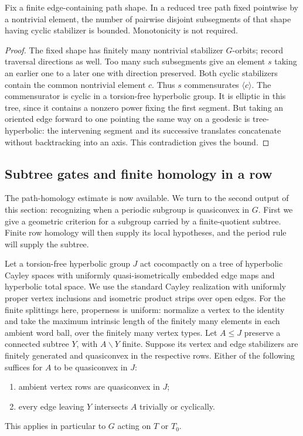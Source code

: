 \begin{lemma}\label{row:cyclic-dictionary}
Fix a finite edge-containing path shape. In a reduced tree path
fixed pointwise by a nontrivial element, the number of pairwise
disjoint subsegments of that shape having cyclic stabilizer is
bounded. Monotonicity is not required.
\end{lemma}

\begin{proof}
The fixed shape has finitely many nontrivial stabilizer \(G\)-orbits;
record traversal directions as well. Too many such subsegments
give an element \(s\) taking an earlier one to a later one with
direction preserved. Both cyclic stabilizers contain the common
nontrivial element \(c\). Thus \(s\) commensurates \(\langle c\rangle\).
The commensurator is cyclic in a torsion-free hyperbolic group.
It is elliptic in this tree, since it contains a nonzero power
fixing the first segment. But taking an oriented edge forward to
one pointing the same way on a geodesic is tree-hyperbolic: the
intervening segment and its successive translates concatenate
without backtracking into an axis. This contradiction gives the bound.
\end{proof}

\subsection{Subtree gates and finite homology in a row}

The path-homology estimate is now available. We turn to the second
output of this section: recognizing when a periodic subgroup is
quasiconvex in \(G\). First we give a geometric criterion for a
subgroup carried by a finite-quotient subtree. Finite row homology
will then supply its local hypotheses, and the period rule will
supply the subtree.

\begin{lemma}\label{row:boundary-gates}
Let a torsion-free hyperbolic group \(J\) act cocompactly on a tree
of hyperbolic Cayley spaces with uniformly quasi-isometrically
embedded edge maps and hyperbolic total space. We use the standard
Cayley realization with uniformly proper vertex inclusions and
isometric product strips over open edges. For the finite splittings
here, properness is uniform: normalize a vertex to the identity and
take the maximum intrinsic length of the finitely many elements in
each ambient word ball, over the finitely many vertex types.
Let \(A\leq J\) preserve a connected subtree \(Y\), with
\(A\backslash Y\) finite. Suppose its vertex and edge stabilizers
are finitely generated and quasiconvex in the respective rows.
Either of the following suffices for \(A\) to be quasiconvex in \(J\):
\begin{enumerate}[label=(\roman*)]
\item ambient vertex rows are quasiconvex in \(J\);
\item every edge leaving \(Y\) intersects \(A\) trivially or cyclically.
\end{enumerate}
This applies in particular to \(G\) acting on \(T\) or \(T_0\).
\end{lemma}

